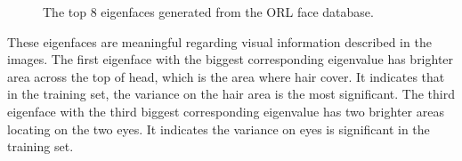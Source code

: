 \begin{figure}[ht]
\caption{The top 8 eigenfaces generated from the \mbox{ORL} face database.}
\label{fig:eigenfaces}
\end{figure} 
These eigenfaces are meaningful regarding visual information described in the images. The first eigenface with the biggest corresponding eigenvalue has brighter area across the top of head, which is the area where hair cover. It indicates that in the training set, the variance on the hair area is the most significant. The third eigenface with the third biggest corresponding eigenvalue has two brighter areas locating on the two eyes. It indicates the variance on eyes is significant in the training set.

